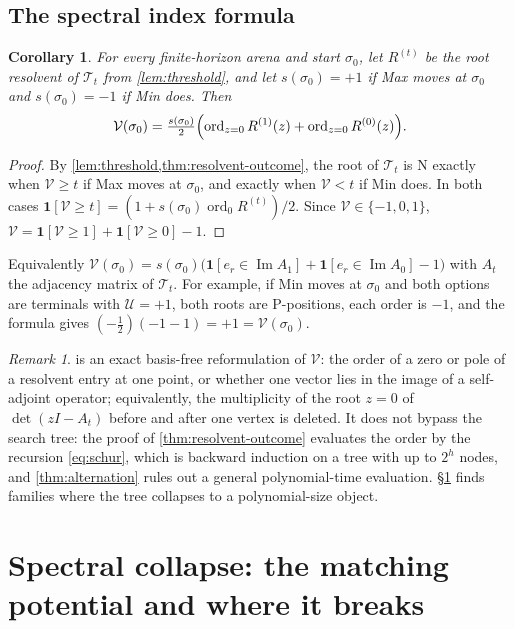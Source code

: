 \documentclass[11pt]{amsart}
\theoremstyle{plain}
\newtheorem{corollary}[theorem]{Corollary}
\theoremstyle{definition}
\theoremstyle{remark}
\newtheorem{remark}[theorem]{Remark}
\numberwithin{equation}{section}
\newcommand{\val}{\mathcal{V}}            %
\newcommand{\pay}{\mathcal{U}}            %
\newcommand{\ord}{\operatorname{ord}}
\newcommand{\one}{\mathbf{1}}
\begin{document}
\subsection{The spectral index formula}
\begin{corollary}\label{cor:index}
For every finite-horizon arena and start $\sigma_0$, let $R^{(t)}$ be the root resolvent of $\mathcal T_t$ from \cref{lem:threshold}, and let $s(\sigma_0)=+1$ if Max moves at $\sigma_0$ and $s(\sigma_0)=-1$ if Min does. Then
\[
\val(\sigma_0)=\tfrac{s(\sigma_0)}2\Bigl(\ord_{z=0}R^{(1)}(z)+\ord_{z=0}R^{(0)}(z)\Bigr).
\]
\end{corollary}

\begin{proof}
By \cref{lem:threshold,thm:resolvent-outcome}, the root of $\mathcal T_t$ is N exactly when $\val\ge t$ if Max moves at $\sigma_0$, and exactly when $\val<t$ if Min does. In both cases $\one[\val\ge t]=(1+s(\sigma_0)\ord_0R^{(t)})/2$. Since $\val\in\{-1,0,1\}$, $\val=\one[\val\ge1]+\one[\val\ge0]-1$.
\end{proof}

Equivalently $\val(\sigma_0)=s(\sigma_0)\bigl(\one[e_r\in\operatorname{Im}A_1]+\one[e_r\in\operatorname{Im}A_0]-1\bigr)$ with $A_t$ the adjacency matrix of $\mathcal T_t$. For example, if Min moves at $\sigma_0$ and both options are terminals with $\pay=+1$, both roots are P-positions, each order is $-1$, and the formula gives $(-\frac12)(-1-1)=+1=\val(\sigma_0)$.

\begin{remark}\label{rem:index}
 is an exact basis-free reformulation of $\val$: the order of a zero or pole of a resolvent entry at one point, or whether one vector lies in the image of a self-adjoint operator; equivalently, the multiplicity of the root $z=0$ of $\det(zI-A_t)$ before and after one vertex is deleted. It does not bypass the search tree: the proof of \cref{thm:resolvent-outcome} evaluates the order by the recursion \eqref{eq:schur}, which is backward induction on a tree with up to $2^h$ nodes, and \cref{thm:alternation} rules out a general polynomial-time evaluation. \S\ref{sec:matching} finds families where the tree collapses to a polynomial-size object.
\end{remark}

\section{Spectral collapse: the matching potential and where it breaks}\label{sec:matching}
\end{document}
